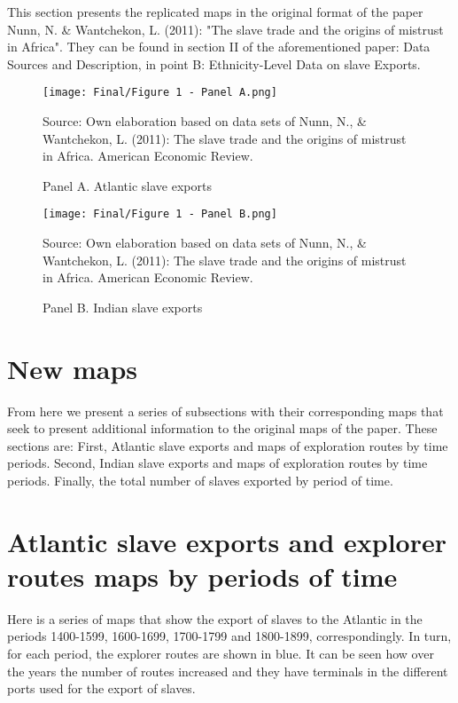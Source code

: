 \documentclass[a4paper,11pt]{article}
\begin{document}
This section presents the replicated maps in the original format of the paper Nunn, N. \& Wantchekon, L. (2011): "The slave trade and the origins of mistrust in Africa". They can be found in section II of the aforementioned paper: Data Sources and Description, in point B: Ethnicity-Level Data on slave Exports.

\begin{figure}[H]
\caption{Panel A. Atlantic slave exports}
\centering
\texttt{[image: Final/Figure 1 - Panel A.png]}
\label{}
\centering

Source: Own elaboration based on data sets of Nunn, N., \& Wantchekon, L. (2011): The slave trade and the origins of mistrust in Africa. American Economic Review.
\end{figure}

\begin{figure}[H]
\caption{Panel B. Indian slave exports}
\centering
\texttt{[image: Final/Figure 1 - Panel B.png]}
\label{}
\centering

Source: Own elaboration based on data sets of Nunn, N., \& Wantchekon, L. (2011): The slave trade and the origins of mistrust in Africa. American Economic Review.
\end{figure}



\section*{\textcolor{officegreen}{New maps}}

From here we present a series of subsections with their corresponding maps that seek to present additional information to the original maps of the paper. These sections are: First, Atlantic slave exports and maps of exploration routes by time periods. Second, Indian slave exports and maps of exploration routes by time periods. Finally, the total number of slaves exported by period of time.


\section*{\textcolor{officegreen}{Atlantic slave exports and explorer routes maps by periods of time}}

Here is a series of maps that show the export of slaves to the Atlantic in the periods 1400-1599, 1600-1699, 1700-1799 and 1800-1899, correspondingly. In turn, for each period, the explorer routes are shown in blue. It can be seen how over the years the number of routes increased and they have terminals in the different ports used for the export of slaves.
\end{document}
